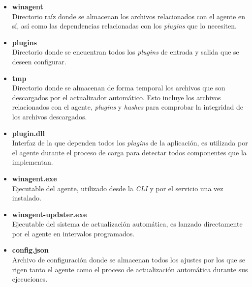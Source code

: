             \begin{itemize}
                \item \textbf{winagent} \\
                    Directorio raíz donde se almacenan los archivos relacionados con el agente en sí, así como las dependencias relacionadas con los \textit{plugins} que lo necesiten.
                    
                \item \textbf{plugins} \\
                    Directorio donde se encuentran todos los \textit{plugins} de entrada y salida que se deseen configurar.
                    
                \item \textbf{tmp} \\
                    Directorio donde se almacenan de forma temporal los archivos que son descargados por el actualizador automático. Esto incluye los archivos relacionados con el agente, \textit{plugins} y \textit{hashes} para comprobar la integridad de los archivos descargados.
                    
                \item \textbf{plugin.dll} \\
                    Interfaz de la que dependen todos los \textit{plugins} de la aplicación, es utilizada por el agente durante el proceso de carga para detectar todos componentes que la implementan.
                
                \item \textbf{winagent.exe} \\
                    Ejecutable del agente, utilizado desde la \textit{CLI} y por el servicio una vez instalado.
                
                \item \textbf{winagent-updater.exe} \\
                    Ejecutable del sistema de actualización automática, es lanzado directamente por el agente en intervalos programados.
                
                \item \textbf{config.json} \\
                    Archivo de configuración donde se almacenan todos los ajustes por los que se rigen tanto el agente como el proceso de actualización automática durante sus ejecuciones.
                
            \end{itemize}
            
